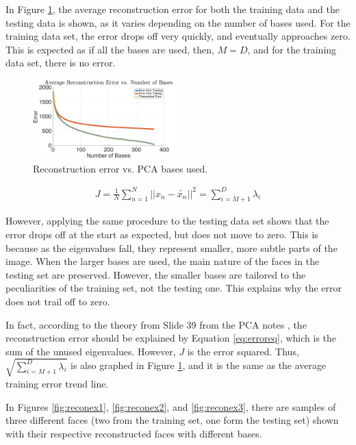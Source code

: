 \documentclass[a4paper, 10pt, conference]{ieeeconf}
\begin{document}
In Figure \ref{fig:reconerror}, the average reconstruction error for both the training data and the testing data is shown, as it varies depending on the number of bases used. For the training data set, the error drops off very quickly, and eventually approaches zero. This is expected as if all the bases are used, then, $M = D$, and for the training data set, there is no error.

\begin{figure}[!ht]
    \centering
    \includegraphics[width=0.5\textwidth]{src/error.png}
    \caption{Reconstruction error vs. PCA bases used.}
    \label{fig:reconerror}
\end{figure}

\begin{align}
  J = \frac{1}{N} \sum_{n=1}^{N} \lvert \lvert x_n - \widetilde{x_n} \rvert \rvert ^2 = \sum_{i = M+1}^{D} \lambda_i \label{eq:erroreq}
\end{align}

However, applying the same procedure to the testing data set shows that the error drops off at the start as expected, but does not move to zero. This is because as the eigenvalues fall, they represent smaller, more subtle parts of the image. When the larger bases are used, the main nature of the faces in the testing set are preserved. However, the smaller bases are tailored to the peculiarities of the training set, not the testing one. This explains why the error does not trail off to zero.

In fact, according to the theory from Slide 39 from the PCA notes \cite{pca}, the reconstruction error should be explained by Equation \ref{eq:erroreq}, which is the sum of the unused eigenvalues. However, $J$ is the error squared. Thus, $\sqrt{\sum_{i = M+1}^{D} \lambda_i}$ is also graphed in Figure \ref{fig:reconerror}, and it is the same as the average training error trend line.

In Figures \ref{fig:reconex1}, \ref{fig:reconex2}, and \ref{fig:reconex3}, there are samples of three different faces (two from the training set, one form the testing set) shown with their respective reconstructed faces with different bases.
\end{document}
